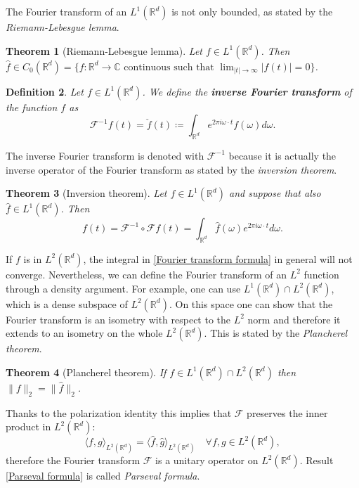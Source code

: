 \documentclass[corpo=11pt, stile=classica, tipotesi=custom,
greek, evenboxes, english]{toptesi}
\numberwithin{equation}{chapter}
\newtheorem{teo}{Theorem}[chapter] %
\newtheorem{defi}[teo]{Definition}
\theoremstyle{definition}
\theoremstyle{remark}
\newcommand{\R}{\mathbb{R}} %
\newcommand{\F}{\mathscr{F}} %
\newcommand{\C}{\mathbb{C}} %
\begin{document}
The Fourier transform of an $L^1(\R^d)$ is not only bounded, as stated by the \emph{Riemann-Lebesgue lemma}.
\begin{teo}[Riemann-Lebesgue lemma]\label{Riemann-Lebesgue lemma}
	Let $f \in L^1(\R^d)$. Then $\hat{f} \in C_0(\R^d) = \{f : \R^d \rightarrow \C \text{ continuous such that } \lim_{|t| \rightarrow \infty} |f(t)|=0\}$.
\end{teo}
\begin{defi}\label{inverse Fourier transform def}
	Let $f \in L^1(\R^d)$. We define the \textbf{inverse Fourier transform} of the function $f$ as
	\begin{equation}\label{inverse Fourier transform formula}
		\F^{-1} f(t) = \check{f}(t) \coloneqq \int_{\R^d} e^{2 \pi i \omega \cdot t} f(\omega) d\omega.
	\end{equation}
\end{defi}
The inverse Fourier transform is denoted with $\F^{-1}$ because it is actually the inverse operator of the Fourier transform as stated by the \emph{inversion theorem}.
\begin{teo}[Inversion theorem]\label{inversion theorem}
	Let $f \in L^1(\R^d)$ and suppose that also $\hat{f} \in L^1(\R^d)$. Then
	\begin{equation*}
		f(t) = \F^{-1} \circ \F f(t) = \int_{\R^d} \hat{f}(\omega) e^{2 \pi i \omega \cdot t}d\omega.
	\end{equation*}
\end{teo}
If $f$ is in $L^2(\R^d)$, the integral in \eqref{Fourier transform formula} in general will not converge. Nevertheless, we can define the Fourier transform of an $L^2$ function through a density argument. For example, one can use $L^1(\R^d) \cap L^2(\R^d)$, which is a dense subspace of $L^2(\R^d)$. On this space one can show that the Fourier transform is an isometry with respect to the $L^2$ norm and therefore it extends to an isometry on the whole $L^2(\R^d)$. This is stated by the \emph{Plancherel theorem}.
\begin{teo}[Plancherel theorem]\label{Plancherel theorem}
	If $f \in L^1(\R^d) \cap L^2(\R^d)$ then $\| f \|_2 = \| \hat{f} \|_2$.
\end{teo}
Thanks to the polarization identity this implies that $\F$ preserves the inner product in $L^2(\R^d)$:
\begin{equation}\label{Parseval formula}
	\langle f,g \rangle_{L^2(\R^d)} = \langle \hat{f}, \hat{g} \rangle_{L^2(\R^d)} \quad \forall f,g \in L^2(\R^d),
\end{equation}
therefore the Fourier transform $\F$ is a unitary operator on $L^2(\R^d)$. Result \eqref{Parseval formula} is called \emph{Parseval formula}.
\end{document}
